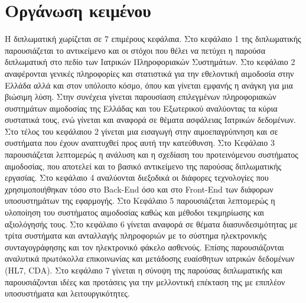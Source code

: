 \section{Οργάνωση κειμένου}
H διπλωματική χωρίζεται σε 7 επιμέρους κεφάλαια. Στο κεφάλαιο 1 της διπλωματικής παρουσιάζεται το αντικείμενο και οι στόχοι που θέλει να πετύχει η παρούσα διπλωματική στο πεδίο των Ιατρικών Πληροφοριακών Συστημάτων. Στο κεφάλαιο 2 αναφέρονται γενικές πληροφορίες και στατιστικά για την εθελοντική αιμοδοσία στην Ελλάδα αλλά και στον υπόλοιπο κόσμο, όπου και γίνεται εμφανής η ανάγκη για μια βιώσιμη λύση. Στην συνέχεια γίνεται παρουσίαση επιλεγμένων πληροφοριακών συστημάτων αιμοδοσίας της Ελλάδας και του Εξωτερικού αναλύοντας τα κύρια συστατικά τους, ενώ γίνεται και αναφορά σε θέματα ασφάλειας Ιατρικών δεδομένων. Στο τέλος του κεφάλαιου 2 γίνεται μια εισαγωγή στην αιμοεπαγρύπνηση και σε συστήματα που έχουν αναπτυχθεί προς αυτή την κατεύθυνση. Στο Κεφάλαιο 3 παρουσιάζεται λεπτομερώς η ανάλυση και η σχεδίαση του προτεινόμενου συστήματος αιμοδοσίας, που αποτελεί και το βασικό αντικείμενο της παρούσας διπλωματικής εργασίας. Στο κεφάλαιο 4 αναλύονται διεξοδικά οι διάφορες τεχνολογίες που χρησιμοποιήθηκαν τόσο στο Back-End όσο και στο Front-End των διάφορων υποσυστημάτων της εφαρμογής. Στο Κεφάλαιο 5 παρουσιάζεται λεπτομερώς η υλοποίηση του συστήματος αιμοδοσίας καθώς και μέθοδοι τεκμηρίωσης και αξιολόγησής τους. Στο κεφάλαιο 6 γίνεται αναφορά σε θέματα διασυνδεσιμότητας με τρίτα συστήματα και ανταλλαγής πληροφοριών με το σύστημα ηλεκτρονικής συνταγογράφησης και τον ηλεκτρονικό φάκελο ασθενούς. Επίσης παρουσιάζονται αναλυτικά πρωτόκολλα επικοινωνίας και μετάδοσης ευαίσθητων ιατρικών δεδομένων (HL7, CDA). Στο κεφάλαιο 7 γίνεται η σύνοψη της παρούσας διπλωματικής και παρουσιάζονται ιδέες και προτάσεις για την μελλοντική επέκταση της με επιπλέον υποσυστήματα και λειτουργικότητες.